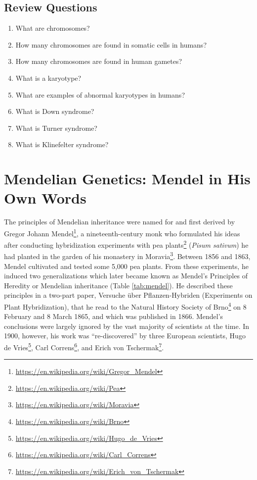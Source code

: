 \documentclass[]{book}
\providecommand{\tightlist}{%
  \setlength{\itemsep}{0pt}\setlength{\parskip}{0pt}}
\let\rmarkdownfootnote\footnote%
\def\footnote{\protect\rmarkdownfootnote}
\renewcommand{\href}[2]{#2\footnote{\url{#1}}}
\theoremstyle{definition}
\theoremstyle{definition}
\theoremstyle{definition}
\theoremstyle{remark}
\begin{document}
\section{Review Questions}\label{review-questions-2}

\begin{enumerate}
\def\labelenumi{\arabic{enumi}.}
\tightlist
\item
  What are chromosomes?
\item
  How many chromosomes are found in somatic cells in humans?
\item
  How many chromosomes are found in human gametes?
\item
  What is a karyotype?
\item
  What are examples of abnormal karyotypes in humans?
\item
  What is Down syndrome?
\item
  What is Turner syndrome?
\item
  What is Klinefelter syndrome?
\end{enumerate}

\chapter{Mendelian Genetics: Mendel in His Own
Words}\label{mendelian-genetics-mendel-in-his-own-words}

The principles of Mendelian inheritance were named for and first derived
by \href{https://en.wikipedia.org/wiki/Gregor_Mendel}{Gregor Johann
Mendel}, a nineteenth-century monk who formulated his ideas after
conducting hybridization experiments with
\href{https://en.wikipedia.org/wiki/Pea}{pea plants} (\emph{Pisum
sativum}) he had planted in the garden of his monastery in
\href{https://en.wikipedia.org/wiki/Moravia}{Moravia}. Between 1856 and
1863, Mendel cultivated and tested some 5,000 pea plants. From these
experiments, he induced two generalizations which later became known as
Mendel's Principles of Heredity or Mendelian inheritance (Table
\ref{tab:mendel}). He described these principles in a two-part paper,
Versuche über Pflanzen-Hybriden (Experiments on Plant Hybridization),
that he read to the Natural History Society of
\href{https://en.wikipedia.org/wiki/Brno}{Brno} on 8 February and 8
March 1865, and which was published in 1866. Mendel's conclusions were
largely ignored by the vast majority of scientists at the time. In 1900,
however, his work was ``re-discovered'' by three European scientists,
\href{https://en.wikipedia.org/wiki/Hugo_de_Vries}{Hugo de Vries},
\href{https://en.wikipedia.org/wiki/Carl_Correns}{Carl Correns}, and
\href{https://en.wikipedia.org/wiki/Erich_von_Tschermak}{Erich von
Tschermak}.
\end{document}
